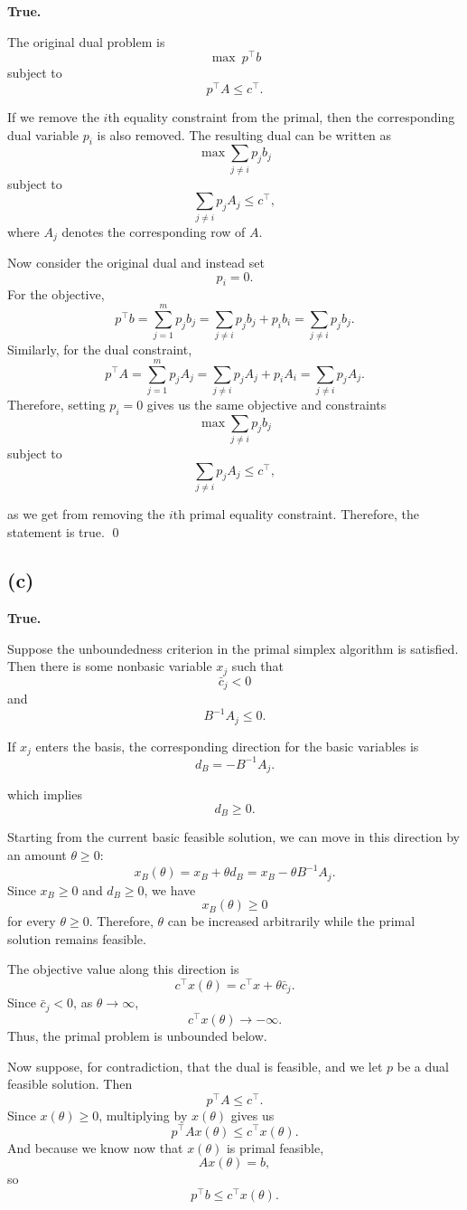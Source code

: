 \documentclass{article}
\begin{document}
\textbf{True.}

The original dual problem is
\[
\max \ p^\top b
\]
subject to
\[
p^\top A \leq c^\top.
\]

If we remove the $i$th equality constraint from the primal, then the
corresponding dual variable $p_i$ is also removed. The resulting dual can
be written as
\[
\max \sum_{j\neq i} p_j b_j
\]
subject to
\[
\sum_{j\neq i} p_j A_j \leq c^\top,
\]
where $A_j$ denotes the corresponding row of $A$.

Now consider the original dual and instead set
\[
p_i=0.
\]
For the objective,
\[
p^\top b
=
\sum_{j=1}^m p_jb_j
=
\sum_{j\neq i}p_jb_j+p_ib_i
=
\sum_{j\neq i}p_jb_j.
\]
Similarly, for the dual constraint,
\[
p^\top A
=
\sum_{j=1}^m p_jA_j
=
\sum_{j\neq i}p_jA_j+p_iA_i
=
\sum_{j\neq i}p_jA_j.
\]
Therefore, setting $p_i=0$ gives us the same objective and constraints
\[
\max \sum_{j\neq i}p_jb_j
\]
subject to
\[
\sum_{j\neq i}p_jA_j\leq c^\top,
\]

as we get from removing the $i$th primal
equality constraint. Therefore, the statement is true. \qed


\vspace{5mm}
\subsection*{(c)}


\textbf{True.}

Suppose the unboundedness criterion in the primal simplex algorithm is
satisfied. Then there is some nonbasic variable $x_j$ such that
\[
\bar c_j<0
\]
and
\[
B^{-1}A_j\leq 0.
\]

If $x_j$ enters the basis, the corresponding direction for the basic
variables is
\[
d_B=-B^{-1}A_j.
\]
 
which implies
\[
d_B\geq0.
\]

Starting from the current basic feasible solution, we can move in this
direction by an amount $\theta\geq0$:
\[
x_B(\theta)
=
x_B+\theta d_B
=
x_B-\theta B^{-1}A_j.
\]
Since $x_B\geq0$ and $d_B\geq0$, we have
\[
x_B(\theta)\geq0
\]
for every $\theta\geq0$. Therefore, $\theta$ can be increased
arbitrarily while the primal solution remains feasible.

The objective value along this direction is
\[
c^\top x(\theta)
=
c^\top x+\theta\bar c_j.
\]
Since $\bar c_j<0$, as $\theta\to\infty$,
\[
c^\top x(\theta)\to-\infty.
\]
Thus, the primal problem is unbounded below.

Now suppose, for contradiction, that the dual is feasible, and we let $p$
be a dual feasible solution. Then
\[
p^\top A\leq c^\top.
\]
Since $x(\theta)\geq0$, multiplying by $x(\theta)$ gives us 
\[
p^\top A x(\theta)\leq c^\top x(\theta).
\]
And because we know now that $x(\theta)$ is primal feasible,
\[
Ax(\theta)=b,
\]
so
\[
p^\top b\leq c^\top x(\theta).
\]
\end{document}
